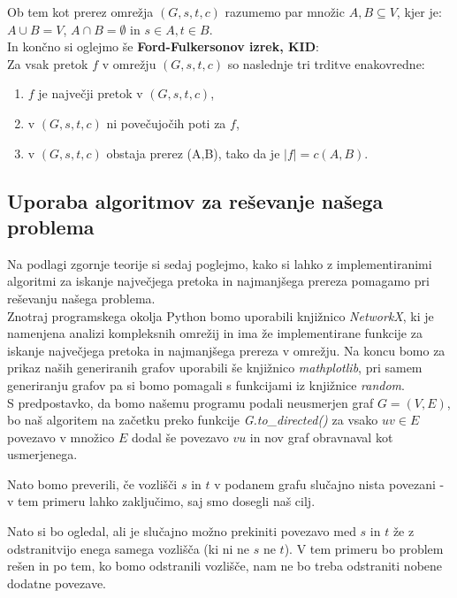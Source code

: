 \documentclass[a4paper,12pt]{article}
\theoremstyle{definition}
\begin{document}
Ob tem kot prerez omrežja $(G,s,t,c)$ razumemo par množic $A,B \subseteq V$, kjer je:
$A \cup B = V $, $A \cap B = \emptyset$ in $s \in A, t \in B$.\\
\newline
\newline
In končno si oglejmo še \textbf{Ford-Fulkersonov izrek, KID}:\\
Za vsak pretok $f$ v omrežju $(G,s,t,c)$ so naslednje tri trditve enakovredne:
\begin{enumerate}
	\item $f$ je največji pretok v $(G,s,t,c)$,
	\item v $(G,s,t,c)$ ni povečujočih poti za $f$,
	\item v $(G,s,t,c)$ obstaja prerez (A,B), tako da je $ \lvert f \rvert = c(A,B)$.
\end{enumerate}
 

\subsection{Uporaba algoritmov za reševanje našega problema}

Na podlagi zgornje teorije si sedaj poglejmo, kako si lahko z implementiranimi
algoritmi za iskanje največjega pretoka in najmanjšega prereza pomagamo pri 
reševanju našega problema.\\

Znotraj programskega okolja Python bomo uporabili knjižnico \emph{NetworkX}, ki je namenjena
analizi kompleksnih omrežij in ima že implementirane funkcije za iskanje 
največjega pretoka in najmanjšega prereza v omrežju. Na koncu bomo za prikaz 
naših generiranih grafov uporabili še knjižnico \emph{mathplotlib},
pri samem generiranju grafov pa si bomo pomagali s funkcijami iz knjižnice \emph{random}.\\

S predpostavko, da bomo našemu programu podali neusmerjen graf $G = (V,E)$, 
bo naš algoritem na začetku preko funkcije \textit{G.to\_directed()}
za vsako $uv \in E$ povezavo v množico $E$ dodal še povezavo $vu$ in 
nov graf obravnaval kot usmerjenega.

Nato bomo preverili, če vozlišči $s$ in $t$ v podanem grafu 
slučajno nista povezani - v tem primeru lahko zaključimo, saj smo dosegli naš cilj.

Nato si bo ogledal, ali je slučajno možno prekiniti povezavo med $s$ in $t$ 
že z odstranitvijo enega samega vozlišča (ki ni ne $s$ ne $t$). 
V tem primeru bo problem rešen in po tem, ko bomo odstranili vozlišče,
nam ne bo treba odstraniti nobene dodatne povezave.
\end{document}
